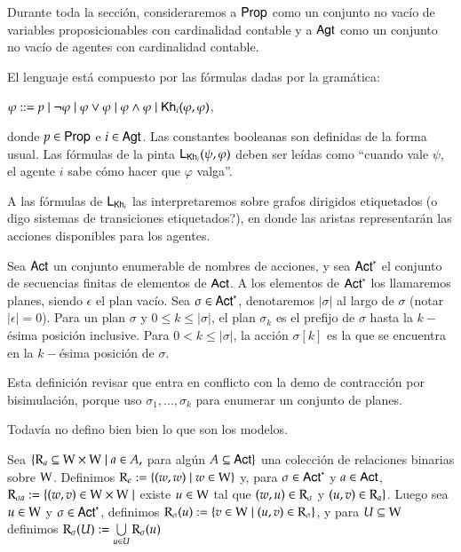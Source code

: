 Durante toda la sección, consideraremos a ${\rm \sf Prop}$ como un conjunto no vacío de variables proposicionables con cardinalidad contable y a ${\rm \sf Agt}$ como un conjunto no vacío de agentes con cardinalidad contable. 

\begin{definicion}
    El lenguaje \KHilogic está compuesto por las fórmulas dadas por la gramática:
    \begin{center}
        $\varphi ::= p \mid \neg \varphi \mid \varphi \vee \varphi \mid \varphi \wedge \varphi \mid \mathsf{Kh}_i(\varphi,\varphi)$,
    \end{center}
    donde $p \in {\rm \sf Prop}$ e $i \in {\rm \sf Agt}$. Las constantes booleanas son definidas de la forma usual. Las fórmulas de la pinta $\mathsf{L}_{\mathsf{Kh}_i}(\psi, \varphi)$ deben ser leídas como ``cuando vale $\psi$, el agente $i$ sabe cómo hacer que $\varphi$ valga''.
\end{definicion}

A las fórmulas de $\mathsf{L}_{\mathsf{Kh}_i}$ las interpretaremos sobre grafos dirigidos etiquetados (o digo sistemas de transiciones etiquetados?), en donde las aristas representarán las acciones disponibles para los agentes.

\begin{definicion}
    Sea ${\rm \sf Act}$ un conjunto enumerable de nombres de acciones, y sea ${\rm \sf Act}^*$ el conjunto de secuencias finitas de elementos de ${\rm \sf Act}$. A los elementos de ${\rm \sf Act}^*$ los llamaremos planes, siendo $\epsilon$ el plan vacío. Sea $\sigma \in {\rm \sf Act}^*$, denotaremos $|\sigma|$ al largo de $\sigma$ (notar $|\epsilon| = 0$). Para un plan $\sigma$ y $0 \leq k \leq |\sigma|$, el plan $\sigma_k$ es el prefijo de $\sigma$ hasta la $k-$ésima posición inclusive. Para $0 < k \leq |\sigma|$, la acción $\sigma[k]$ es la que se encuentra en la $k-$ésima posición de $\sigma$.  
\end{definicion}

Esta definición revisar que entra en conflicto con la demo de contracción por bisimulación, porque uso $\sigma_1,...,\sigma_k$ para enumerar un conjunto de planes.

Todavía no defino bien bien lo que son los modelos.

\begin{definicion}
    Sea $\{\mathrm{R}_a \subseteq \mathrm{W} \times \mathrm{W} \mid a \in A,$ para algún $A \subseteq {\rm \sf Act} \}$ una colección de relaciones binarias sobre $\mathrm{W}$. Definimos $\mathrm{R}_\epsilon := \{(w,w) \mid w \in \mathrm{W}\}$ y, para $\sigma \in {\rm \sf Act}^*$ y $a \in {\rm \sf Act}$, $\mathrm{R}_{\sigma a} := \{(w,v) \in \mathrm{W} \times \mathrm{W} \mid$ existe $u \in \mathrm{W}$ tal que $(w,u) \in \mathrm{R}_\sigma$ y $(u,v) \in \mathrm{R}_a \}$. Luego sea $u \in \mathrm{W}$ y $\sigma \in {\rm \sf Act}^*$, definimos $\mathrm{R}_\sigma(u) := \{v\in\mathrm{W} \mid (u,v) \in \mathrm{R}_\sigma\}$, y para $U\subseteq\mathrm{W}$ definimos $\mathrm{R}_\sigma(U) := \bigcup\limits_{u \in U} \mathrm{R}_\sigma(u)$
\end{definicion}
